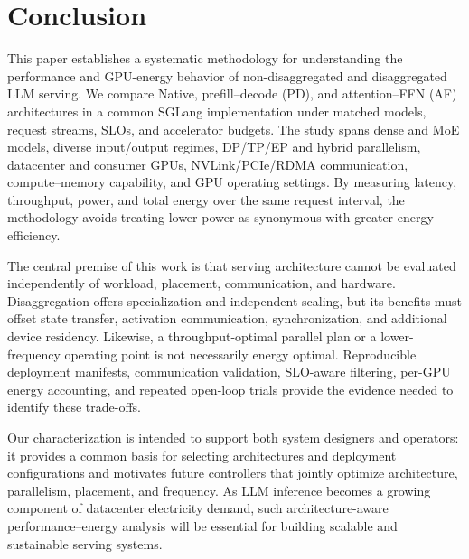 \section{Conclusion}
\label{sec:conclusion}

This paper establishes a systematic methodology for understanding the performance and GPU-energy behavior of non-disaggregated and disaggregated LLM serving. We compare Native, prefill--decode (PD), and attention--FFN (AF) architectures in a common SGLang implementation under matched models, request streams, SLOs, and accelerator budgets. The study spans dense and MoE models, diverse input/output regimes, DP/TP/EP and hybrid parallelism, datacenter and consumer GPUs, NVLink/PCIe/RDMA communication, compute--memory capability, and GPU operating settings. By measuring latency, throughput, power, and total energy over the same request interval, the methodology avoids treating lower power as synonymous with greater energy efficiency.

The central premise of this work is that serving architecture cannot be evaluated independently of workload, placement, communication, and hardware. Disaggregation offers specialization and independent scaling, but its benefits must offset state transfer, activation communication, synchronization, and additional device residency. Likewise, a throughput-optimal parallel plan or a lower-frequency operating point is not necessarily energy optimal. Reproducible deployment manifests, communication validation, SLO-aware filtering, per-GPU energy accounting, and repeated open-loop trials provide the evidence needed to identify these trade-offs.

Our characterization is intended to support both system designers and operators: it provides a common basis for selecting architectures and deployment configurations and motivates future controllers that jointly optimize architecture, parallelism, placement, and frequency. As LLM inference becomes a growing component of datacenter electricity demand, such architecture-aware performance--energy analysis will be essential for building scalable and sustainable serving systems.
